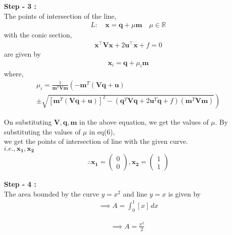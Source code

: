 \documentclass[10pt,a4paper]{report}
\newcommand{\myvec}[1]{\ensuremath{\begin{pmatrix}#1\end{pmatrix}}}
\let\vec\mathbf
\providecommand{\brak}[1]{\ensuremath{\left(#1\right)}}
\providecommand{\lbrak}[1]{\ensuremath{\left(#1\right.}}
\providecommand{\rbrak}[1]{\ensuremath{\left.#1\right)}}
\providecommand{\sbrak}[1]{\ensuremath{{}\left[#1\right]}}
\begin{document}
\begin{multicols}{2}
\raggedright \textbf{Step - 3 :}\\ \vspace{2mm}
The points of intersection of the line, \\ 
\begin{align}
L: \quad \vec{x} = \vec{q} + \mu \vec{m} \quad \mu \in \mathbb{R}
\end{align}
with the conic section, \\ 
\begin{align}
	\vec{x}^{\top}\vec{V}\vec{x} + 2\vec{u}^{\top} \vec{x} + f = 0
\end{align}
are given by \\
\begin{align}
\vec{x}_i = \vec{q} + \mu_i \vec{m}
\end{align}
where, \\
{\tiny
\begin{multline}
\mu_i = \frac{1}
{
\vec{m}^T\vec{V}\vec{m}
}
\lbrak{-\vec{m}^T\brak{\vec{V}\vec{q}+\vec{u}}}
\\
\pm
\rbrak{\sqrt{
\sbrak{
\vec{m}^T\brak{\vec{V}\vec{q}+\vec{u}}
}^2
-
\brak
{
\vec{q}^T\vec{V}\vec{q} + 2\vec{u}^T\vec{q} +f
}
\brak{\vec{m}^T\vec{V}\vec{m}}
}
}
\end{multline}
}
\raggedright On substituting $\vec{V},\vec{q} ,\vec{m}$ in the above equation,
we get the values of $\mu$. By substituting the values of $\mu$ in eq(6), \\we get the points of intersection of line with the given curve. \\
\centering $i.e., \vec{x_1},\vec{x_2}$\\ 

\begin{align}
\therefore \vec{x_1}=\myvec{0\\0} , \vec{x_2}=\myvec{1\\1}
\end{align}

\raggedright \textbf{Step - 4 :}\\ \vspace{2mm}
The area bounded by the curve $y=x^2$ and line $y=x$ is given by\\

\begin{align}
\implies A=\int_{0}^{1} [x] \,dx
\end{align}

\begin{align}
\implies A=\frac{x^2}{2} \
\end{align}


\end{multicols}
\end{document}
